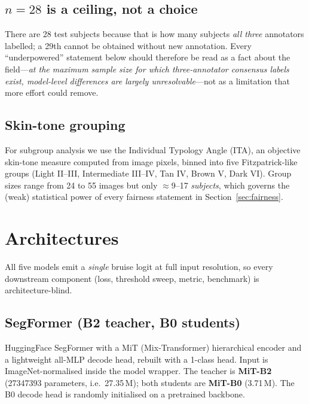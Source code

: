 \documentclass[11pt]{article}
\begin{document}
\subsection{$n=28$ is a ceiling, not a choice}
There are 28 test subjects because that is how many subjects \emph{all three}
annotators labelled; a 29th cannot be obtained without new annotation. Every
``underpowered'' statement below should therefore be read as a fact about the
field---\emph{at the maximum sample size for which three-annotator consensus
labels exist, model-level differences are largely unresolvable}---not as a
limitation that more effort could remove.

\subsection{Skin-tone grouping}
For subgroup analysis we use the Individual Typology Angle (ITA), an objective
skin-tone measure computed from image pixels, binned into five Fitzpatrick-like
groups (Light II--III, Intermediate III--IV, Tan IV, Brown V, Dark VI). Group
sizes range from 24 to 55 images but only $\approx$9--17 \emph{subjects}, which
governs the (weak) statistical power of every fairness statement in
Section~\ref{sec:fairness}.

\section{Architectures}
All five models emit a \emph{single} bruise logit at full input resolution, so
every downstream component (loss, threshold sweep, metric, benchmark) is
architecture-blind.

\subsection{SegFormer (B2 teacher, B0 students)}
HuggingFace SegFormer with a MiT (Mix-Transformer) hierarchical encoder and a
lightweight all-MLP decode head, rebuilt with a 1-class head. Input is
ImageNet-normalised inside the model wrapper. The teacher is \textbf{MiT-B2}
(\num{27347393} parameters, i.e.\ 27.35\,M); both students are \textbf{MiT-B0}
(3.71\,M). The B0 decode head is randomly initialised on a pretrained backbone.
\end{document}
